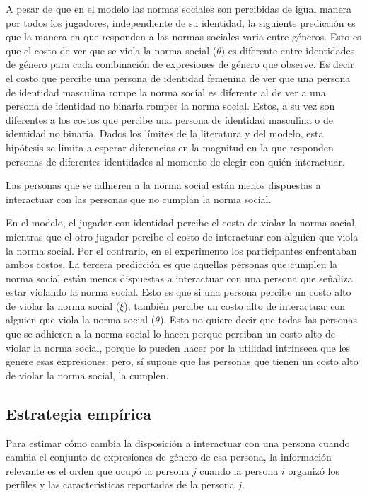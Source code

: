 A pesar de que en el modelo las normas sociales son percibidas de igual manera por todos los jugadores, independiente de su identidad, la siguiente predicción es que la manera en que responden a las normas sociales varia entre géneros. Esto es que el costo de ver que se viola la norma social ($\theta$) es diferente entre identidades de género para cada combinación de expresiones de género que observe. Es decir el costo que percibe una persona de identidad femenina de ver que una persona de identidad masculina rompe la norma social es diferente al de ver a una persona de identidad no binaria romper la norma social. Estos, a su vez son diferentes a los costos que percibe una persona de identidad masculina o de identidad no binaria. Dados los límites de la literatura y del modelo, 
esta hipótesis se limita a esperar diferencias en la magnitud en la que responden personas de diferentes identidades al momento de elegir con quién interactuar. 

\begin{hyp}
Las personas que se adhieren a la norma social están menos dispuestas a interactuar con las personas que no cumplan la norma social. 
\end{hyp}

En el modelo, el jugador con identidad percibe el costo de violar la norma social, mientras que el otro jugador percibe el costo de interactuar con alguien que viola la norma social. Por el contrario, en el experimento los participantes enfrentaban ambos costos. La tercera predicción es que aquellas personas que cumplen la norma social están menos dispuestas a interactuar con una persona que señaliza estar violando la norma social. Esto es que si una persona percibe un costo alto de violar la norma social ($\xi$), también percibe un costo alto de interactuar con alguien que viola la norma social ($\theta$). Esto no quiere decir que todas las personas que se adhieren a la norma social lo hacen porque perciban un costo alto de violar la norma social, porque lo pueden hacer por la utilidad intrínseca que les genere esas expresiones; pero, sí supone que las personas que tienen un costo alto de violar la norma social, la cumplen.

\subsection{Estrategia empírica}
Para estimar cómo cambia la disposición a interactuar con una persona cuando cambia el conjunto de expresiones de género de esa persona, la información relevante es el orden que ocupó la persona $j$ cuando la persona $i$ organizó los perfiles y las características reportadas de la persona $j$.

